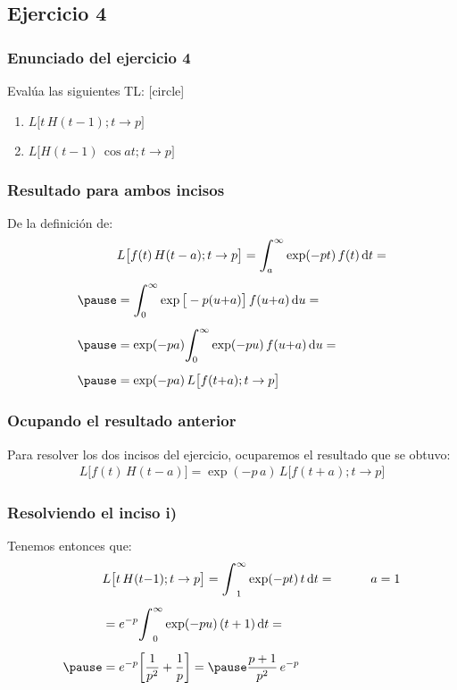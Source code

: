 \documentclass[12pt]{beamer}
\begin{document}
\subsection{Ejercicio 4}

\begin{frame}
\frametitle{Enunciado del ejercicio 4}
Evalúa las siguientes TL:
\pause
{}
[circle]
\begin{enumerate}[<+->]
\item $L \big[ t \, H(t - 1); t \to p \big]$
\item $L \big[ H(t - 1) \, \cos a t; t \to p \big]$
\end{enumerate}
\end{frame}
\begin{frame}
\frametitle{Resultado para ambos incisos}
De la definición de:
\pause
\begin{eqnarray*}
\begin{aligned}
&L \big[ f(t) \, H (t - a); t \to p \big] = \scaleint{6ex}_{\bs a}^{\infty} \exp(- p t) \, f(t) \dd{t} = \\[0.5em] \pause
&=  \scaleint{6ex}_{\bs 0}^{\infty} \exp\big[ - p (u {+} a) \big] \, f(u {+} a) \dd{u} = \\[0.5em] \pause
&= \exp(- p a) \scaleint{6ex}_{\bs 0}^{\infty} \exp(- p u) \, f(u {+} a) \dd{u} = \\[0.5em] \pause
&= \exp(- p a) \, L \big[ f (t {+} a); t \to p \big]
\end{aligned}
\end{eqnarray*}
\end{frame}
\begin{frame}
\frametitle{Ocupando el resultado anterior}
Para resolver los dos incisos del ejercicio, ocuparemos el resultado que se obtuvo:
\pause
\begin{align*}
L \big[ f(t) \, H (t{-} a) \big] = \exp(- p \, a) \, L \big[ f (t {+} a); t \to p \big]    
\end{align*}
\end{frame}
\begin{frame}
\frametitle{Resolviendo el inciso i)}
Tenemos entonces que:
\pause
\begin{eqnarray*}
\begin{aligned}
&L \big[ t \, H(t {-} 1); t \to p \big] = \scaleint{6ex}_{1}^{\infty} \exp(- p t) \, t \dd{t} = \hspace{1cm} a = 1 \\[0.5em]
&= e^{-p} \scaleint{6ex}_{0}^{\infty} \exp(- p u) \, (t + 1) \dd{t} = \\[0.5em] \pause
&= e^{-p} \bigg[ \dfrac{1}{p^{2}} + \dfrac{1}{p} \bigg] = \pause \dfrac{p + 1}{p^{2}} \, e^{-p}
\end{aligned}
\end{eqnarray*}
\end{frame}
\end{document}
